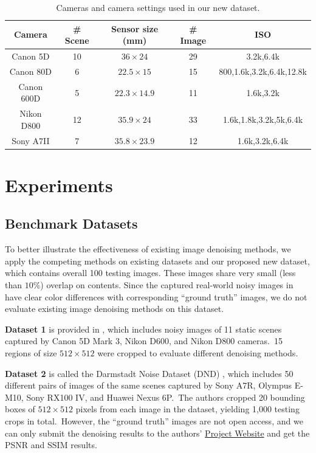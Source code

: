 \begin{table}[t!]
\caption{Cameras and camera settings used in our new dataset.}
\label{tab6-4}
\begin{center}
\small
\renewcommand\arraystretch{1.2}
\begin{tabular*}{1\textwidth}{@{\extracolsep{\fill}}ccccc}
\hline
Camera
&
\# Scene
&
Sensor size (mm)
&
\# Image
&
ISO
\\
\hline
Canon 5D & 10  & $36\times24$  & 29  & 3.2k,6.4k
\\
\hline
Canon 80D & 6  & $22.5\times15$  & 15 & 800,1.6k,3.2k,6.4k,12.8k 
\\
\hline   
Canon 600D & 5 & $22.3\times14.9$  & 11  & 1.6k,3.2k 
\\
\hline   
Nikon D800 & 12 & $35.9\times24$  & 33 & 1.6k,1.8k,3.2k,5k,6.4k 
\\
\hline   
Sony A7II & 7 & $35.8\times23.9$  & 12  & 1.6k,3.2k,6.4k 
\\
\hline
\end{tabular*}
\end{center}
\vspace{-5mm}
\end{table}

\section{Experiments}

\subsection{Benchmark Datasets} 

To better illustrate the effectiveness of existing image denoising methods, we apply the competing methods on existing datasets \cite{crosschannel2016,dnd2017} and our proposed new dataset, which contains overall 100 testing images. These images share very small (less than $10\%$) overlap on contents. Since the captured real-world noisy images in \cite{RENOIR2014} have clear color differences with corresponding ``ground truth'' images, we do not evaluate existing image denoising methods on this dataset.

\textbf{Dataset 1} is provided in \cite{crosschannel2016}, which includes noisy images of 11 static scenes captured by Canon 5D Mark 3, Nikon D600, and Nikon D800 cameras.\ 15 regions of size $512\times512$ were cropped to evaluate different denoising methods.  

\textbf{Dataset 2} is called the Darmstadt Noise Dataset (DND) \cite{dnd2017}, which includes 50 different pairs of images of the same scenes captured by Sony A7R, Olympus E-M10, Sony RX100 IV, and Huawei Nexus 6P.\ The authors cropped 20 bounding boxes of $512\times512$ pixels from each image in the dataset, yielding 1,000 testing crops in total.\ However, the ``ground truth'' images are not open access, and we can only submit the denoising results to the authors' \href{https://noise.visinf.tu-darmstadt.de/}{Project Website} and get the PSNR and SSIM \cite{ssim} results.


